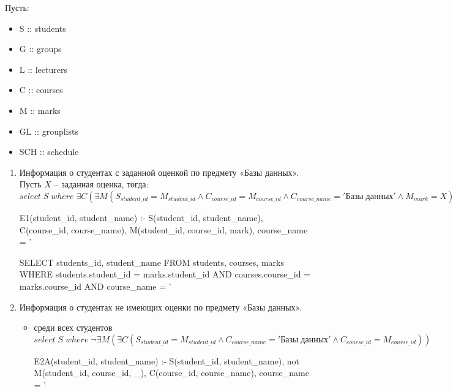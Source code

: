 \documentclass[10pt, a4paper]{article}
\title{}
\author{Андрей Козлов, гр. 4538}
\date{}
\begin{document}
\maketitle

Пусть:
\begin{itemize}
	\item S :: students
	\item G :: groups
	\item L :: lecturers
	\item C :: courses
	\item M :: marks
	\item GL :: grouplists
	\item SCH :: schedule
\end{itemize}

\begin{enumerate}

	\item {Информация о студентах с заданной оценкой по предмету «Базы данных».\\
	Пусть $X$ -- заданная оценка, тогда:\\
	$select \; S \; where \; \exists C (\exists M (S_{student\_id} = M_{student\_id} \wedge C_{course\_id} = M_{course\_id} \wedge C_{course\_name} = 'Базы \; данных' \wedge M_{mark} = X))$

	\begin{prolog}
E1(student_id, student_name) :- S(student_id, student_name),
	C(course_id, course_name), M(student_id, course_id, mark),
	course_name = '%
	\end{prolog}

	\begin{sql}
SELECT students_id, student_name
FROM students, courses, marks
WHERE students.student_id = marks.student_id AND
	courses.course_id = marks.course_id AND
	course_name = '%
	\end{sql}
	}


	\item {Информация о студентах не имеющих оценки по предмету «Базы данных».
		\begin{itemize}

			\item {среди всех студентов\\
			$select \; S \; where \; \neg \exists M (\exists C (S_{student\_id} = M_{student\_id} \wedge C_{course\_name} = 'Базы \; данных' \wedge C_{course\_id} = M_{course\_id}))$

			\begin{prolog}
E2A(student_id, student_name) :- S(student_id, student_name),
	not M(student_id, course_id, _), C(course_id, course_name),
	course_name = '%
			\end{prolog}

}
\end{itemize}}
\end{enumerate}
\end{document}
